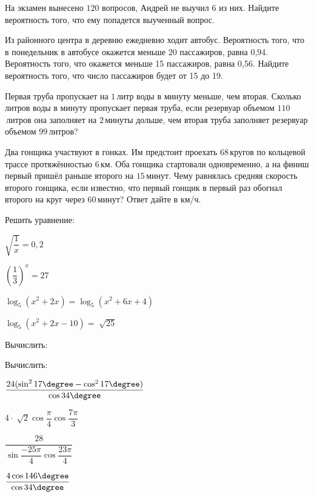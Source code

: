 \begin{listofex}
	\item На экзамен вынесено \( 120 \) вопросов, Андрей не выучил \( 6 \) из них. Найдите вероятность того, что ему попадется выученный вопрос.
	\item Из районного центра в деревню ежедневно ходит автобус. Вероятность того, что в понедельник в автобусе окажется меньше 20 пассажиров, равна 0,94. Вероятность того, что окажется меньше 15 пассажиров, равна 0,56. Найдите вероятность того, что число пассажиров будет от 15 до 19.
	\item Первая труба пропускает на \(1\) литр воды в минуту меньше, чем вторая. Сколько литров воды в минуту пропускает первая труба, если резервуар объемом \(110\) литров она заполняет на \(2\) минуты дольше, чем вторая труба заполняет резервуар объемом \(99\) литров?
	\item Два гонщика участвуют в гонках. Им предстоит проехать \(68\) кругов по кольцевой трассе протяжённостью \(6\) км. Оба гонщика стартовали одновременно, а на финиш первый пришёл раньше второго на \(15\) минут. Чему равнялась средняя скорость второго гонщика, если известно, что первый гонщик в первый раз обогнал второго на круг через \(60\) минут? Ответ дайте в км/ч.
	\item Решить уравнение:
	\begin{enumcols}[itemcolumns=2]
		\item \( \sqrt{\dfrac{1}{x}}=0,2 \)
		\item \( \left( \dfrac{1}{3} \right)^{x}=27 \)
		\item \( \log_5(x^2+2x)=\log_{5}(x^2+6x+4) \)
		\item \( \log_5(x^2+2x-10)=\sqrt[]{25} \)
	\end{enumcols}
	\item Вычислить:
	\begin{enumcols}[itemcolumns=1]
		\item {}
		\item {}
	\end{enumcols}
	\item Вычислить:
	\begin{enumcols}[itemcolumns=2]
		\item \(\dfrac{24(\sin^2{17\degree}-\cos^2{17\degree})}{\cos{34\degree}} \)
		\item \(4 \cdot \sqrt[]{2} \cos{\dfrac{\pi}{4}} \cos{\dfrac{7\pi}{3}} \)
		\item \(\dfrac{28}{\sin{\dfrac{-25\pi}{4}}\cos{\dfrac{23\pi}{4}}} \)
		\item \(\dfrac{4\cos{146\degree}}{\cos{34\degree}} \)

\end{enumcols}
\end{listofex}
